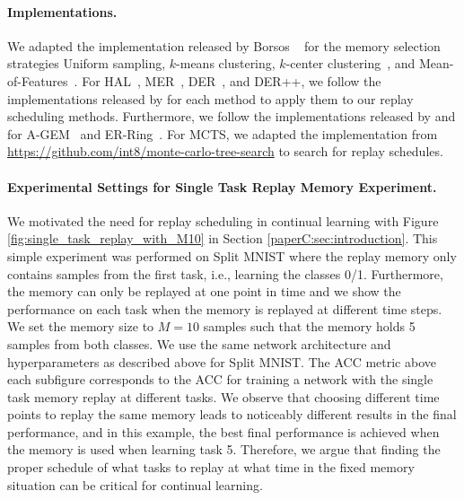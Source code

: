 \paragraph{Implementations.} We adapted the implementation released by Borsos \etal~ for the memory selection strategies Uniform sampling, $k$-means clustering, $k$-center clustering~, and Mean-of-Features~. For HAL~, MER~, DER~, and DER++, we follow the implementations released by  for each method to apply them to our replay scheduling methods. Furthermore, we follow the implementations released by  and  for A-GEM~ and ER-Ring~. For MCTS, we adapted the implementation from {\footnotesize \url{https://github.com/int8/monte-carlo-tree-search}} to search for replay schedules.

\vspace{-2mm}
\paragraph{Experimental Settings for Single Task Replay Memory Experiment.} We motivated the need for replay scheduling in continual learning with Figure \ref{fig:single_task_replay_with_M10} in Section \ref{paperC:sec:introduction}. This simple experiment was performed on Split MNIST where the replay memory only contains samples from the first task, i.e., learning the classes 0/1. Furthermore, the memory can only be replayed at one point in time and we show the performance on each task when the memory is replayed at different time steps. We set the memory size to $M=10$ samples such that the memory holds 5 samples from both classes. We use the same network architecture and hyperparameters as described above for Split MNIST. The ACC metric above each subfigure corresponds to the ACC for training a network with the single task memory replay at different tasks. We observe that choosing different time points to replay the same memory leads to noticeably different results in the final performance, and in this example, the best final performance is achieved when the memory is used when learning task 5. Therefore, we argue that finding the proper schedule of what tasks to replay at what time in the fixed memory situation can be critical for continual learning. 



